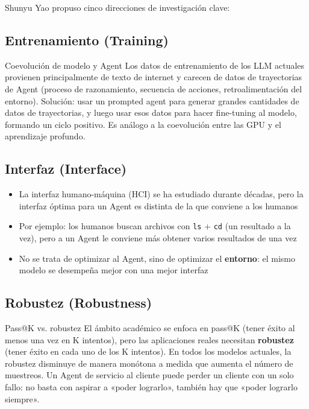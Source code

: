 \documentclass[a4paper]{article}
\begin{document}
Shunyu Yao propuso cinco direcciones de investigación clave:

\subsection{Entrenamiento (Training)}

\begin{importantbox}{Coevolución de modelo y Agent}
Los datos de entrenamiento de los LLM actuales provienen principalmente de texto de internet y carecen de datos de trayectorias de Agent (proceso de razonamiento, secuencia de acciones, retroalimentación del entorno). Solución: usar un prompted agent para generar grandes cantidades de datos de trayectorias, y luego usar esos datos para hacer fine-tuning al modelo, formando un ciclo positivo. Es análogo a la coevolución entre las GPU y el aprendizaje profundo.
\end{importantbox}

\subsection{Interfaz (Interface)}

\begin{itemize}
    \item La interfaz humano-máquina (HCI) se ha estudiado durante décadas, pero la interfaz óptima para un Agent es distinta de la que conviene a los humanos
    \item Por ejemplo: los humanos buscan archivos con \texttt{ls} + \texttt{cd} (un resultado a la vez), pero a un Agent le conviene más obtener varios resultados de una vez
    \item No se trata de optimizar al Agent, sino de optimizar el \textbf{entorno}: el mismo modelo se desempeña mejor con una mejor interfaz
\end{itemize}

\subsection{Robustez (Robustness)}

\begin{warningbox}{Pass@K vs. robustez}
El ámbito académico se enfoca en pass@K (tener éxito al menos una vez en K intentos), pero las aplicaciones reales necesitan \textbf{robustez} (tener éxito en cada uno de los K intentos). En todos los modelos actuales, la robustez disminuye de manera monótona a medida que aumenta el número de muestreos. Un Agent de servicio al cliente puede perder un cliente con un solo fallo: no basta con aspirar a «poder lograrlo», también hay que «poder lograrlo siempre».
\end{warningbox}
\end{document}
